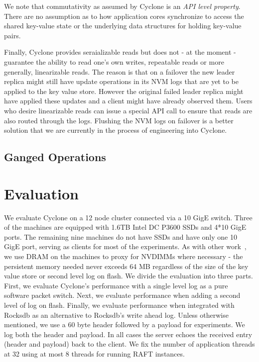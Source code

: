 \documentclass[10pt, preprint, nonatbib]{sigplanconf}
\begin{document}
We note that commutativity as assumed by Cyclone is an \emph{API level
  property}. There are no assumption as to how application cores synchronize to
access the shared key-value state or the underlying data structures for holding
key-value pairs.

Finally, Cyclone provides seraializable reads but does not - at the moment -
guarantee the ability to read one's own writes, repeatable reads or more
generally, linearizable reads. The reason is that on a failover the new leader
replica might still have update operations in its NVM logs that are yet to be
applied to the key value store. However the original failed leader replica might
have applied these updates and a client might have already observed them. Users
who desire linearizable reads can issue a special API call to ensure that reads
are also routed through the logs. Flushing the NVM logs on failover is a better
solution that we are currently in the process of engineering into Cyclone.

\subsection{Ganged Operations}

\section{Evaluation}
We evaluate Cyclone on a 12 node cluster connected via a 10 GigE switch. Three
of the machines are equipped with 1.6TB Intel DC P3600 SSDs and 4*10 GigE
ports. The remaining nine machines do not have SSDs and have only one 10 GigE
port, serving as clients for most of the experiments. As with other
work~\cite{faast}, we use DRAM on the machines to proxy for NVDIMMs where
necessary - the persistent memory needed never exceeds 64 MB regardless of the
size of the key value store or second level log on flash. We divide the
evaluation into three parts. First, we evaluate Cyclone's performance with a
single level log as a pure software packet switch. Next, we evaluate performance
when adding a second level of log on flash. Finally, we evaluate performance
when integrated with Rocksdb as an alternative to Rocksdb's write ahead
log. Unless otherwise mentioned, we use a 60 byte header followed by a payload
for experiments. We log both the header and payload. In all cases the server
echoes the received entry (header and payload) back to the client. We fix the
number of application threads at 32 using at most 8 threads for running RAFT
instances.
\end{document}
